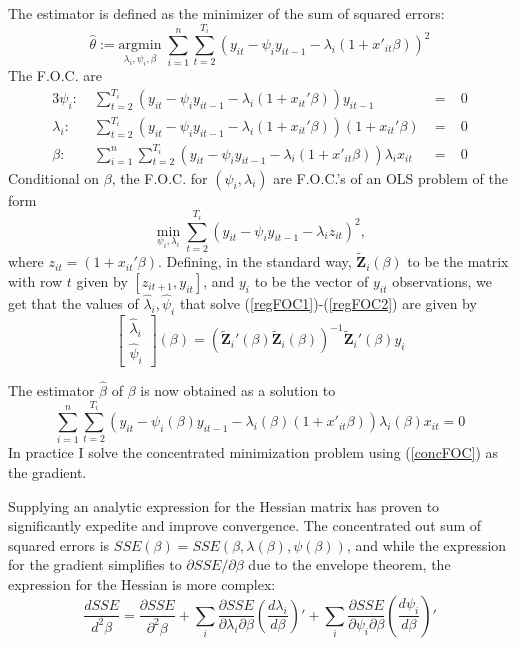 \documentclass[12pt,pagebackref]{article}
\begin{document}
The estimator is defined as the minimizer of the sum of squared errors:
\begin{equation}\label{sse}
 \hat \theta := \underset{\lambda_i, \psi_i, \beta}{\mathrm{argmin}}\;
 \sum_{i=1}^n \sum_{t=2}^{T_i} (y_{it} - \psi_i y_{it-1} - \lambda_i(1+x'_{it}\beta))^2
\end{equation} The F.O.C. are \begin{alignat}{3}
\label{regFOC1} \psi_i:\; & \sum_{t=2}^{T_i} (y_{it} - \psi_iy_{it-1} - \lambda_i(1+x_{it}'\beta))y_{it-1} &\;=\;& 0\\
\label{regFOC2} \lambda_i:\; &\sum_{t=2}^{T_i} (y_{it} - \psi_iy_{it-1} - \lambda_i(1+x_{it}'\beta))(1+x_{it}'\beta) &\;=\;& 0 \\
  \beta:\; & \sum_{i=1}^n \sum_{t=2}^{T_i} (y_{it} - \psi_i y_{it-1} - \lambda_i(1+x'_{it}\beta))\lambda_ix_{it} &\;=\;& 0
\end{alignat} Conditional on \(\beta\), the F.O.C. for
\((\psi_i, \lambda_i)\) are F.O.C.'s of an OLS problem of the form
\[\min_{\psi_i, \lambda_i}\sum_{t=2}^{T_i} (y_{it} - \psi_i y_{it-1} - \lambda_iz_{it})^2,\]
where \(z_{it} = (1+x_{it}'\beta)\). Defining, in the standard way,
\(\tilde{\mathbf Z}_i (\beta)\) to be the matrix with row \(t\) given by
\([z_{it+1}, y_{it}]\), and \(y_i\) to be the vector of \(y_{it}\)
observations, we get that the values of \(\hat \lambda_i,\hat \psi_i\)
that solve (\ref{regFOC1})-(\ref{regFOC2}) are given by
\begin{equation}\label{psilambda}
\begin{bmatrix}
\hat \lambda_i \\
\hat \psi_i
\end{bmatrix}(\beta)
=
(\tilde{\mathbf Z}_i' (\beta)\tilde{\mathbf Z}_i (\beta))^{-1}\tilde{\mathbf Z}_i' (\beta)y_i
\end{equation}

\noindent The estimator \(\hat \beta\) of \(\beta\) is now obtained as a
solution to \begin{equation}\label{concFOC}
\sum_{i=1}^n \sum_{t=2}^{T_i} (y_{it} - \psi_i(\beta) y_{it-1} - \lambda_i(\beta)(1+x'_{it}\beta))\lambda_i(\beta)x_{it} = 0
\end{equation} In practice I solve the concentrated minimization problem
using (\ref{concFOC}) as the gradient.

Supplying an analytic expression for the Hessian matrix has proven to
significantly expedite and improve convergence. The concentrated out sum
of squared errors is
\(SSE(\beta) = SSE(\beta, \lambda(\beta), \psi(\beta))\), and while the
expression for the gradient simplifies to
\(\partial SSE/\partial \beta\) due to the envelope theorem, the
expression for the Hessian is more complex:
\begin{equation}\label{hessianEq}
\frac{d SSE}{d^2\beta} = \frac{\partial SSE}{\partial^2 \beta} + 
\sum_i \frac{\partial SSE}{\partial\lambda_i \partial \beta} \left(\frac{d \lambda_i}{d \beta}\right)' + 
\sum_i \frac{\partial SSE}{\partial\psi_i \partial \beta} \left(\frac{d \psi_i}{d \beta}\right)'
\end{equation}
\end{document}
